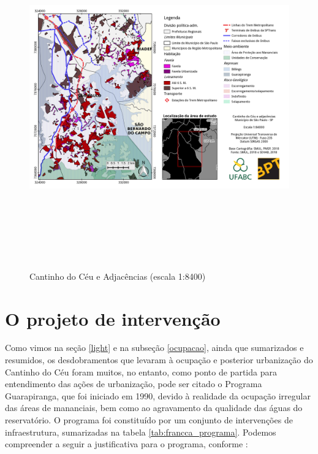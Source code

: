 	\begin{landscape}
		\begin{figure}
			\centering
			\caption{Cantinho do Céu e Adjacências (escala 1:8400)}
			\includegraphics[height=14cm,keepaspectratio]{img/mapa_1-84000}
			\label{fig:mapa_1-84000}
		\end{figure}
	\end{landscape}
	
	\chapter{O projeto de intervenção}
	
	Como vimos na seção \ref{light} e na subseção \ref{ocupacao}, ainda que sumarizados e resumidos, os desdobramentos que levaram à ocupação e posterior urbanização do Cantinho do Céu foram muitos, no entanto, como ponto de partida para entendimento das ações de urbanização, pode ser citado o Programa Guarapiranga, que foi iniciado em 1990, devido à realidade da ocupação irregular das áreas de mananciais, bem como ao agravamento da qualidade das águas do reservatório. O programa foi constituído por um conjunto de intervenções de infraestrutura, sumarizadas na tabela \ref*{tab:francca_programa}. Podemos compreender a seguir a justificativa para o programa, conforme :
	
